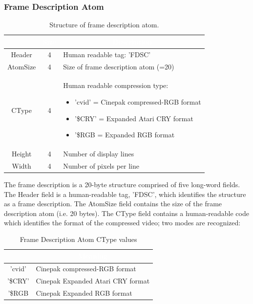 \documentclass[12pt,letterpaper,twoside]{article}
\newcommand{\tabheadtxt}[1]{\multicolumn{1}{c}{\textcolor{white}{\textbf{#1}}}}
\begin{document}
\subsubsection{Frame Description Atom}

\begin{table}[h]
\centering
\begin{tabular}{|c|c|p{10cm}|}
\hline
\rowcolor{black}
\tabheadtxt{Field} & \tabheadtxt{Size} & \tabheadtxt{Description} \\
\hline
Header & 4 & Human readable tag: 'FDSC'\\
\hline
AtomSize & 4 & Size of frame description atom (=20)\\
\hline
CType & 4 & Human readable compression type:
\newline
	\begin{itemize}[nosep]
	\item[] 'cvid' = Cinepak compressed-RGB format
	\item[] '\$CRY' = Expanded Atari CRY format
	\item[] '\$RGB = Expanded RGB format
	\end{itemize}\\
\hline
Height & 4 & Number of display lines\\
\hline
Width & 4 & Number of pixels per line\\
\hline
\end{tabular}
\caption{Structure of frame description atom.}
\label{tab:framedesc}
\end{table}
\FloatBarrier

The frame description is a 20-byte structure comprised of five long-word fields. The Header field is a human-readable tag, 'FDSC', which identifies the structure as a frame description. The AtomSize field contains the size of the frame description atom (i.e. 20 bytes). The CType field contains a human-readable code which identifies the format of the compressed video; two modes are recognized: 

\begin{table}[h]
\centering
\begin{tabular}{|c|p{7cm}|}
\hline
\rowcolor{black}
\tabheadtxt{Value} & \tabheadtxt{Meaning} \\
\hline
'cvid' & Cinepak compressed-RGB format\\
\hline
'\$CRY' & Cinepak Expanded Atari CRY format\\
\hline
'\$RGB & Cinepak Expanded RGB format\\
\hline
\end{tabular}
\caption{Frame Description Atom CType values}
\label{tab:ctypevals}
\end{table}
\FloatBarrier
\end{document}
